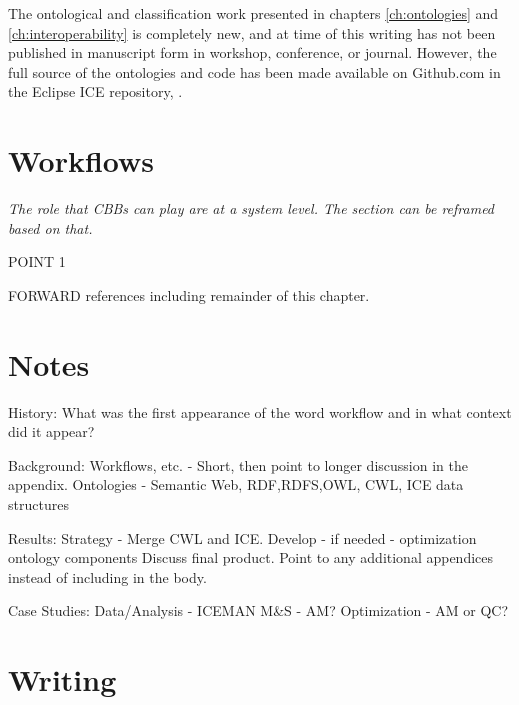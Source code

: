 The ontological and classification work presented in chapters
\ref{ch:ontologies} and \ref{ch:interoperability} is completely new, and at
time of this writing has not been published in manuscript form in
workshop, conference, or journal. However, the full source of the ontologies
and code has been made available on Github.com in the Eclipse ICE repository,
\cite{billings_ice}.


\section{Workflows}

\textit{The role that CBBs can play are at a system level. The section can be
reframed based on that.}


 POINT 1

FORWARD references including remainder of this chapter.

\section{Notes}

History:
What was the first appearance of the word workflow and in what context did it
appear?

Background:
Workflows, etc. - Short, then point to longer discussion in the appendix.
Ontologies - Semantic Web, {RDF,RDFS,OWL}, CWL, ICE data structures

Results:
Strategy - Merge CWL and ICE. Develop - if needed - optimization ontology components
Discuss final product. Point to any additional appendices instead of including in the body.

Case Studies:
Data/Analysis - ICEMAN
M\&S - AM?
Optimization - AM or QC?

\section{Writing}

